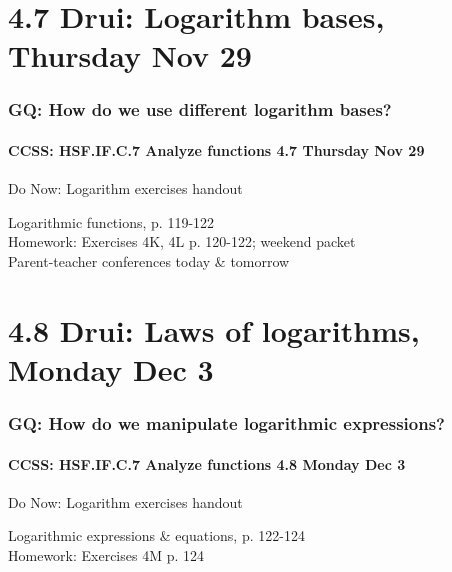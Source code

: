 \documentclass{beamer}
\begin{document}
  \section{4.7 Drui: Logarithm bases, Thursday Nov 29}
    \frame
    {
      \frametitle{GQ: How do we use different logarithm bases?}
      \framesubtitle{CCSS: HSF.IF.C.7 Analyze functions    \alert{4.7 Thursday Nov 29}}

      \begin{block}{Do Now: Logarithm exercises handout}
      \end{block}
      Logarithmic functions, p. 119-122\\ \bigskip
      Homework: Exercises 4K, 4L p. 120-122; weekend packet\\
      \alert{Parent-teacher conferences today \& tomorrow}
    }

  \section{4.8 Drui: Laws of logarithms, Monday Dec 3}
    \frame
    {
      \frametitle{GQ: How do we manipulate logarithmic expressions?}
      \framesubtitle{CCSS: HSF.IF.C.7 Analyze functions    \alert{4.8 Monday Dec 3}}

      \begin{block}{Do Now: Logarithm exercises handout}
      \end{block}
      Logarithmic expressions \& equations, p. 122-124\\ \bigskip
      Homework: Exercises 4M p. 124
    }
\end{document}
